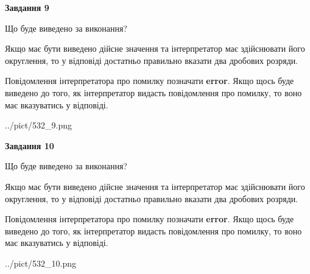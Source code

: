 \documentclass[12pt, ukrainian]{article}
\begin{document}
{\begin {Large}
{\begin {center}\textbf{Завдання 9}\end {center}}\par
Що буде виведено за виконання? \par

Якщо має бути виведено дійсне значення та інтерпретатор має здійснювати його округлення, 
то у відповіді достатньо правильно вказати два дробових розряди.

Повідомлення інтерпретатора про помилку позначати \textbf{error}.
Якщо щось буде виведено до того, як інтерпретатор видасть повідомлення про помилку, 
то воно має вказуватись у відповіді. \par

\begin{center}
	{../pict/532_9.png}
\end{center}
\newpage

{\begin {center}\textbf{Завдання 10}\end {center}}\par
Що буде виведено за виконання? \par

Якщо має бути виведено дійсне значення та інтерпретатор має здійснювати його округлення, 
то у відповіді достатньо правильно вказати два дробових розряди.

Повідомлення інтерпретатора про помилку позначати \textbf{error}.
Якщо щось буде виведено до того, як інтерпретатор видасть повідомлення про помилку, 
то воно має вказуватись у відповіді. \par

\begin{center}
	{../pict/532_10.png}
\end{center}
\newpage

\end {Large}}
\end{document}
